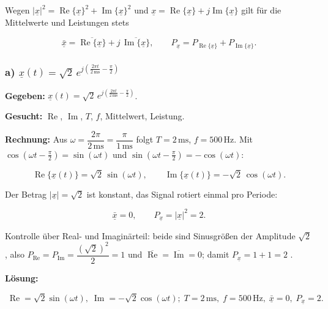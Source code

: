 Wegen $|\underline{x}|^2 = \operatorname{Re}\{\underline{x}\}^2
+ \operatorname{Im}\{\underline{x}\}^2$ und
$\underline{x} = \operatorname{Re}\{\underline{x}\}
+ j\operatorname{Im}\{\underline{x}\}$ gilt für die Mittelwerte und Leistungen
stets

$$
\bar{\underline{x}} = \overline{\operatorname{Re}\{\underline{x}\}}
+ j\,\overline{\operatorname{Im}\{\underline{x}\}},
\qquad
P_{\underline{x}} = P_{\operatorname{Re}\{\underline{x}\}}
+ P_{\operatorname{Im}\{\underline{x}\}}.
$$

\subsubsection*{a) $\underline{x}(t) = \sqrt{2}\,e^{j\left(\frac{2\pi t}{2\,\mathrm{ms}} - \frac{\pi}{2}\right)}$}

\begin{beispiel}

\textbf{Gegeben:}
$\underline{x}(t) = \sqrt{2}\,e^{j\left(\frac{2\pi t}{2\,\mathrm{ms}}
- \frac{\pi}{2}\right)}$.

\textbf{Gesucht:} $\operatorname{Re}$, $\operatorname{Im}$, $T$, $f$,
Mittelwert, Leistung.

\textbf{Rechnung:} Aus $\omega = \dfrac{2\pi}{2\,\mathrm{ms}}
= \dfrac{\pi}{1\,\mathrm{ms}}$ folgt $T = 2\,\mathrm{ms}$, $f = 500\,\mathrm{Hz}$.
Mit $\cos(\omega t - \tfrac{\pi}{2}) = \sin(\omega t)$ und
$\sin(\omega t - \tfrac{\pi}{2}) = -\cos(\omega t)$:

$$
\operatorname{Re}\{\underline{x}(t)\} = \sqrt{2}\,\sin(\omega t),
\qquad
\operatorname{Im}\{\underline{x}(t)\} = -\sqrt{2}\,\cos(\omega t).
$$

Der Betrag $|\underline{x}| = \sqrt{2}$ ist konstant, das Signal rotiert einmal
pro Periode:

$$
\bar{\underline{x}} = 0, \qquad
P_{\underline{x}} = |\underline{x}|^2 = 2.
$$

Kontrolle über Real- und Imaginärteil: beide sind Sinusgrößen der Amplitude
$\sqrt{2}$, also
$P_{\operatorname{Re}} = P_{\operatorname{Im}} = \dfrac{(\sqrt{2})^2}{2} = 1$
und $\overline{\operatorname{Re}} = \overline{\operatorname{Im}} = 0$; damit
$P_{\underline{x}} = 1 + 1 = 2$ \checkmark.

\textbf{Lösung:}

$$
\boxed{\;\operatorname{Re} = \sqrt{2}\sin(\omega t),\;
\operatorname{Im} = -\sqrt{2}\cos(\omega t);\;
T = 2\,\mathrm{ms},\; f = 500\,\mathrm{Hz},\;
\bar{\underline{x}} = 0,\; P_{\underline{x}} = 2.\;}
$$

\end{beispiel}

